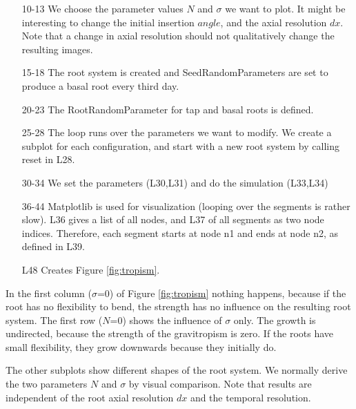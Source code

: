 \begin{itemize}
\item[10-13] We choose the parameter values $N$ and $\sigma$ we want to plot. It might be interesting to change the initial insertion $angle$, and the axial resolution $dx$. Note that a change in axial resolution should not qualitatively change the resulting images.

\item[15-18] The root system is created and SeedRandomParameters are set to produce a basal root every third day. 

\item[20-23] The RootRandomParameter for tap and basal roots is defined.

\item[25-28] The loop runs over the parameters we want to modify. We create a subplot for each configuration, and start with a new root system by calling reset in L28.

\item[30-34] We set the parameters (L30,L31) and do the simulation (L33,L34)

\item[36-44] Matplotlib is used for visualization (looping over the segments is rather slow). L36 gives a list of all nodes, and L37 of all segments as two node indices. Therefore, each segment starts at node n1 and ends at node n2, as defined in L39.

\item[L48] Creates Figure \ref{fig:tropism}.
\end{itemize}

In the first column ($\sigma$=0) of Figure \ref{fig:tropism} nothing happens, because if the root has no flexibility to bend, the strength has no influence on the resulting root system. The first row ($N$=0) shows the influence of $\sigma$ only. The growth is undirected, because the strength of the gravitropism is zero. If the roots have small flexibility, they grow downwards because they initially do. 

The other subplots show different shapes of the root system. We normally derive the two parameters $N$ and $\sigma$ by visual comparison. Note that results are independent of the root axial resolution $dx$ and the temporal resolution.

